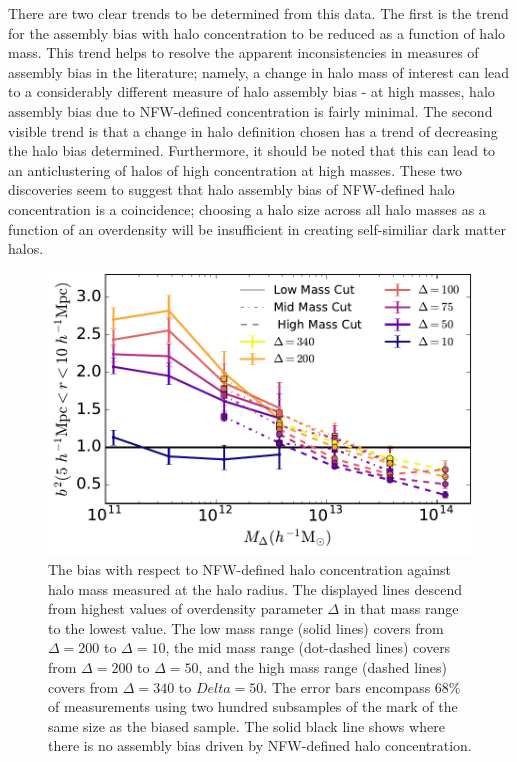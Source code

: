 \documentclass[usenatbib]{mnras}
\begin{document}
There are two clear trends to be determined from this data. The first is the trend for the assembly bias with
halo concentration to be reduced as a function of halo mass. This trend helps to resolve the apparent
inconsistencies in measures of assembly bias in the literature; namely, a change in halo mass of
interest can lead to a considerably different measure of halo assembly bias - at high masses, halo assembly
bias due to NFW-defined concentration is fairly minimal. The second visible trend is that a change in halo
definition chosen has a trend of decreasing the halo bias determined. Furthermore, it should be noted that this
can lead to an anticlustering of halos of high concentration at high masses. These two discoveries seem to
suggest that halo assembly bias of NFW-defined halo concentration is a coincidence; choosing a halo size
across all halo masses as a function of an overdensity will be insufficient in creating self-similiar dark
matter halos.

\begin{figure}
	\centering
	\includegraphics[width=.4\textwidth]{biasplot.pdf}
	\caption{The bias with respect to NFW-defined halo concentration against halo mass measured at the halo
	radius. The displayed lines descend from highest values of overdensity parameter $\Delta$ in that mass
	range to the lowest value. The low mass range (solid lines) covers from $\Delta=200$ to $\Delta=10$, 
	the mid mass range (dot-dashed lines) covers	from $\Delta=200$ to $\Delta=50$, and the 
	high mass range (dashed lines) covers from $\Delta=340$ to $Delta=50$. The
	error bars encompass 68\% of measurements using two hundred subsamples
	of the mark of the same size as the biased sample. The solid black line
	shows where there is no assembly bias driven by NFW-defined halo concentration.}
	\label{fig:biascompare}
\end{figure}
\end{document}

